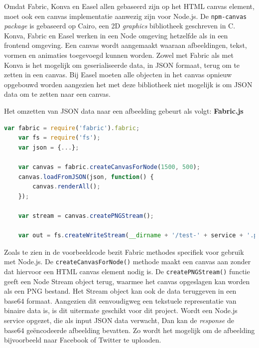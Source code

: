 Omdat Fabric, Konva en Easel allen gebaseerd zijn op het HTML canvas element, moet ook een canvas implementatie aanwezig zijn voor Node.js. De \texttt{npm-canvas} \textit{package} is gebaseerd op Cairo, een 2D \textit{graphics} bibliotheek geschreven in C. %
Konva, Fabric en Easel werken in een Node omgeving hetzelfde als in een frontend omgeving. Een canvas wordt aangemaakt waaraan afbeeldingen, tekst, vormen en animaties toegevoegd kunnen worden. Zowel met Fabric als met Konva is het mogelijk om geserialiseerde data, in JSON formaat, terug om te zetten in een canvas. Bij Easel moeten alle objecten in het canvas opnieuw opgebouwd worden aangezien het met deze bibliotheek niet mogelijk is om JSON data om te zetten naar een canvas. 

Het omzetten van JSON data naar een afbeelding gebeurt als volgt:
\break
\textbf{Fabric.js}
\begin{lstlisting}[caption={JSON naar een afbeelding in Fabric.js},label=lst:FabricCanvasCreation1,language=javascript]
	var fabric = require('fabric').fabric;
	var fs = require('fs');
	var json = {...};
	
	var canvas = fabric.createCanvasForNode(1500, 500);
	canvas.loadFromJSON(json, function() {
		canvas.renderAll();
	});
	
	var stream = canvas.createPNGStream();
	
	var out = fs.createWriteStream(__dirname + '/test-' + service + '.png');
\end{lstlisting}

Zoals te zien in de voorbeeldcode bezit Fabric methodes specifiek voor gebruik met Node.js. De \texttt{createCanvasForNode()} methode maakt een canvas aan zonder dat hiervoor een HTML canvas element nodig is. De \texttt{createPNGStream()} functie geeft een Node Stream object terug, waarmee het canvas opgeslagen kan worden als een PNG bestand. Het Stream object kan ook de data teruggeven in een base64 formaat. Aangezien dit eenvoudigweg een tekstuele representatie van binaire data is, is dit uitermate geschikt voor dit project. Wordt een Node.js service opgezet, die als input JSON data verwacht, Dan kan de \textit{response} de base64 ge\"{e}ncodeerde afbeelding bevatten. Zo wordt het mogelijk om de afbeelding bijvoorbeeld naar Facebook of Twitter te uploaden. 


